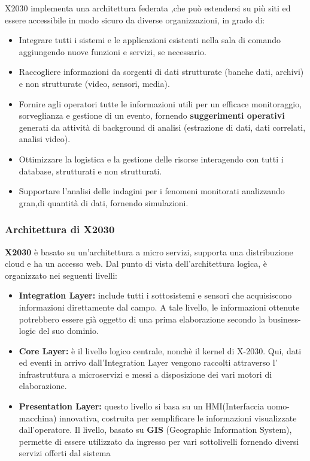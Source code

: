 X2030 implementa una architettura federata ,che può estendersi su più siti ed essere
accessibile in modo sicuro da diverse organizzazioni, in grado di:
\begin{itemize}

    \item Integrare tutti i sistemi e le applicazioni esistenti nella sala di comando
     aggiungendo nuove funzioni e servizi, se necessario.
    \item Raccogliere informazioni da sorgenti di dati strutturate (banche dati,
    archivi) e non strutturate (video, sensori, media).
    \item Fornire agli operatori tutte le informazioni utili
     per un efficace monitoraggio, sorveglianza e gestione di un evento,
    fornendo \textbf{suggerimenti operativi} generati da
    attività di background di analisi (estrazione di dati, dati
    correlati, analisi video).
    \item Ottimizzare la logistica e la gestione delle risorse interagendo con
    tutti i database, strutturati e non strutturati.
    \item Supportare l'analisi delle indagini per i 
    fenomeni monitorati analizzando gran,di quantità di dati,
    fornendo simulazioni.

\end{itemize}


\subsubsection{Architettura di X2030}
\textbf{X2030} è basato su un'architettura a micro servizi,
supporta una distribuzione cloud e ha un accesso web.
Dal punto di vista dell'architettura logica,
è organizzato nei seguenti livelli:
\begin{itemize}
    \item \textbf{Integration Layer:} include tutti i sottosistemi e
    sensori che acquisiscono informazioni direttamente dal 
    campo. A tale livello, le informazioni ottenute
    potrebbero essere già oggetto di una prima elaborazione
    secondo la business-logic del suo dominio.
    \item \textbf{Core Layer:} è il livello logico centrale, nonchè il
    kernel di X-2030. Qui, dati ed eventi in arrivo
    dall'Integration Layer vengono raccolti attraverso l'
    infrastruttura a microservizi e messi
    a disposizione dei vari motori di elaborazione.
    \item \textbf{Presentation Layer:} questo livello si basa su
    un HMI(Interfaccia uomo-macchina) innovativa, costruita per semplificare le
    informazioni visualizzate dall'operatore. Il livello, basato su 
    \textbf{GIS} (Geographic Information System),
    permette di essere utilizzato da ingresso per vari sottolivelli fornendo
    diversi servizi offerti dal sistema
\end{itemize}



